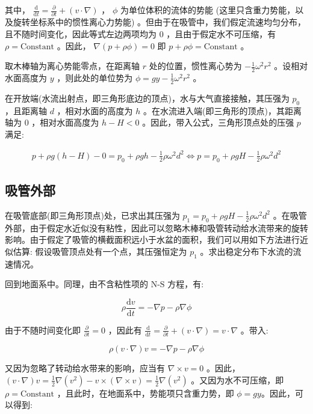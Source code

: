 \documentclass[fontset=windows]{article}
\begin{document}
其中， $\frac{\text{d}}{\text{d}t} = \frac{\partial}{\partial t} + (v \cdot \nabla)$ ， $\phi$ 为单位体积的流体的势能 (这里只含重力势能，以及旋转坐标系中的惯性离心力势能) 。但由于在吸管中，我们假定流速均匀分布，且不随时间变化，因此等式左边两项均为 $0$ ，且由于假定水不可压缩，有 $\rho = \text{Constant}$ 。因此， $\nabla (p + \rho \phi) = 0$ 即 $p + \rho \phi = \text{Constant}$ 。

取木棒轴为离心势能零点，在距离轴 $r$ 处的位置，惯性离心势为 $-\frac{1}{2}\omega^2 r^2$ 。设相对水面高度为 $y$ ，则此处的单位势为 $\phi = gy - \frac{1}{2}\omega^2 r^2$ 。

在开放端(水流出射点，即三角形底边的顶点)，水与大气直接接触，其压强为 $p_0$ ，且距离轴 $d$ ，相对水面的高度为 $h$ 。在水流进入端(即三角形的顶点)，其距离轴为 $0$ ，相对水面高度为 $h - H < 0$ 。因此，带入公式，三角形顶点处的压强 $p$ 满足:

$$
\begin{aligned}
    p + \rho g (h - H) - 0 = p_0 + \rho g h - \frac{1}{2}\rho\omega^2 d^2
    \iff p = p_0 + \rho g H - \frac{1}{2}\rho\omega^2 d^2
\end{aligned}
$$

\subsection{吸管外部}

在吸管底部(即三角形顶点)处，已求出其压强为 $p_1 = p_0 + \rho g H - \frac{1}{2}\rho\omega^2 d^2$ 。在吸管外部，由于假定水近似没有粘性，因此可以忽略木棒和吸管转动给水流带来的旋转影响。由于假定了吸管的横截面积远小于水盆的面积，我们可以用如下方法进行近似估算: 假设吸管顶点处有一个点，其压强恒定为 $p_1$ 。求出稳定分布下水流的流速情况。

回到地面系中。同理，由不含粘性项的 $\text{N-S}$ 方程，有:

$$
\rho\frac{\text{d}v}{\text{d}t} = - \nabla p - \rho \nabla \phi
$$

由于不随时间变化即 $\frac{\partial}{\partial t} = 0$ ，因此有 $\frac{\text{d}}{\text{d}t} = \frac{\partial}{\partial t} + (v \cdot \nabla) = v \cdot \nabla$ 。带入:

$$
\rho (v \cdot \nabla) v = - \nabla p - \rho \nabla \phi
$$

又因为忽略了转动给水带来的影响，应当有 $\nabla \times v = 0$ 。因此，$(v \cdot \nabla) v = \frac{1}{2} \nabla (v^2) - v \times (\nabla \times v) = \frac{1}{2} \nabla (v^2)$ 。又因为水不可压缩，即 $\rho = \text {Constant}$ ，且此时，在地面系中，势能项只含重力势，即 $\phi = gy$。因此，可以得到:
\end{document}
